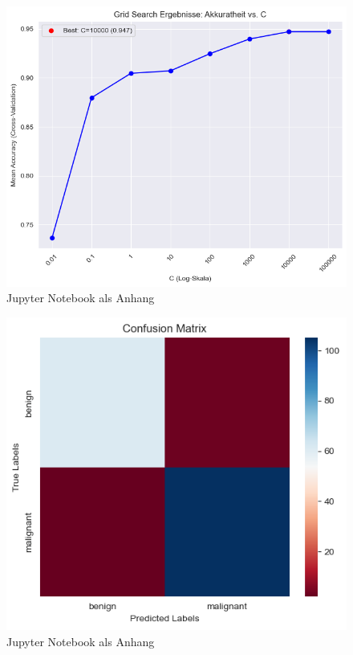 \documentclass[a4paper,12pt]{article}
\begin{document}
\begin{figure}[H]
    \centering
    \includegraphics[width=\textwidth]{gridcodesvm.png}
    \caption{Jupyter Notebook als Anhang}
    \label{fig:gcsvm}
\end{figure}
\begin{figure}[H]
    \centering
    \includegraphics[width=\textwidth]{confsvmrbf.png}
    \caption{Jupyter Notebook als Anhang}
    \label{fig:confsvmrbf}
\end{figure}
\end{document}
